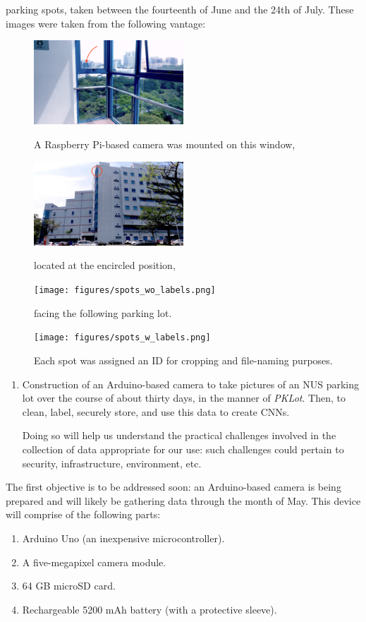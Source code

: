 \documentclass[a4paper, 11pt]{article} %
\begin{document}
	parking spots, taken between the fourteenth of June and the 24th of July. These images were taken 
	from the following vantage:
	\vskip 5mm
	\begin{figure}[H]
		\centering
		\includegraphics[width=0.5\textwidth]{figures/context.jpg}
		\caption{A Raspberry Pi-based camera was mounted on this window,}
		\includegraphics[width=0.5\textwidth]{figures/context_2.jpg}
		\caption{located at the encircled position,}
		\vskip 5mm
		\texttt{[image: figures/spots\_wo\_labels.png]}
		\caption{facing the following parking lot.}
	\end{figure}
	\begin{figure}[H]
		\centering
		\texttt{[image: figures/spots\_w\_labels.png]}
		\caption{Each spot was assigned an ID for cropping and file-naming purposes.}
	\end{figure}

\begin{enumerate}
	\item Construction of an Arduino-based camera to take pictures of an NUS parking lot over the 
	course of about thirty days, in the manner of \textit{PKLot}. Then, to clean, label, securely store, 
	and use this data to create CNNs.
	\begin{adjustwidth}{6mm}{}
		Doing so will help us understand the practical challenges involved in the collection of  
		data appropriate for our use: such challenges could pertain to security, infrastructure, 
		environment,  etc.
	\end{adjustwidth}
\end{enumerate}
\newpage
The first objective is to be addressed soon: an Arduino-based camera is being prepared and will 
likely be gathering data through the month of May. This device will comprise of the following parts:
\begin{enumerate}
	\item Arduino Uno (an inexpensive microcontroller).
	\item A five-megapixel camera module.
	\item 64 GB microSD card.
	\item Rechargeable 5200 mAh battery (with a protective sleeve).
\end{enumerate}
\end{document}
